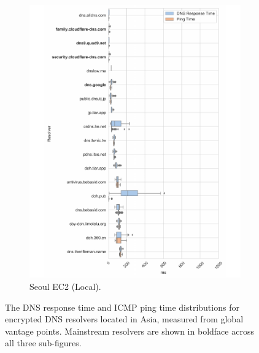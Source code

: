 \begin{figure}[h!]
\begin{subfigure}[b]{0.4\textwidth}
\includegraphics[width=\textwidth]{figures/seoul_asia.pdf}
    \caption{Seoul EC2 (Local).}
\end{subfigure}
\caption{The DNS response time and ICMP ping time distributions for
    encrypted DNS resolvers located in Asia, measured from global vantage points.
    Mainstream resolvers are shown in boldface across all three
    sub-figures.}
\label{fig:dns-asia}
\end{figure}
